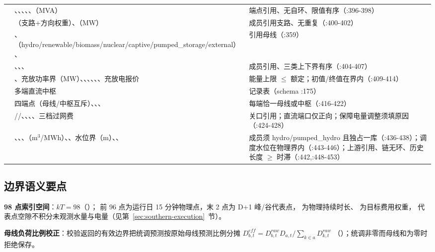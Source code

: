 \begin{center}
\begin{longtable}{@{}L{2.8cm}L{5.6cm}L{6.9cm}@{}}
 & 、、、、、（MVA） & 端点引用、无自环、限值有序（:396-398）\\
 & （支路+方向权重）、（MW） & 成员引用支路、无重复（:400-402）\\
 & 、（hydro/renewable/biomass/nuclear/captive/\allowbreak pumped\_storage/external）、 & 引用母线（:359）\\
 & 、、、 & 成员引用、三类上下界有序（:404-407）\\
 & 、充放功率界（MW）、、、、、、充放电报价 & 能量上限 $\le$ 额定；初值/终值在界内（:409-414）\\
 & 多端直流中枢 & 记录表（schema :175）\\
 & 四端点（母线/中枢互斥）、、、 & 每端恰一母线或中枢（:416-422）\\
 & //、、、、三档过网费 & 关口引用；直流端口仅正向；保障电量调整须填原因（:424-428）\\
 & 、、、（m$^3$/MWh）、、水位界（m）、、 & 成员须 hydro/pumped\_hydro 且独占一库（:436-438）；调度水位在物理界内（:443-446）；上游引用、链无环、历史长度 $\ge$ 时滞（:442,:448-453）\\
\bottomrule
\end{longtable}
\end{center}

\subsection{边界语义要点}
\textbf{98 点索引空间}：$kT=98$（）；
前 96 点为运行日 15 分钟物理点，末 2 点为 D+1 峰/谷代表点，
 为物理持续时长、 为目标费用权重，
代表点空隙不积分未观测水量与电量（见第~\ref{sec:southern-execution}~节）。

\textbf{母线负荷比例校正}：校验返回的有效边界把统调预测按原始母线预测比例分摊
$D^{eff}_{b,t}=D^{raw}_{b,t}D_{a,t}/\sum_{k\in a}D^{raw}_{k,t}$
（）；统调非零而母线和为零时拒绝保存。

